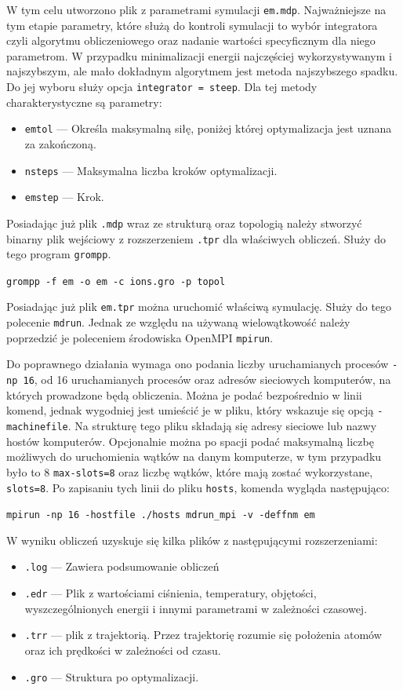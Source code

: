 W tym celu utworzono plik z parametrami symulacji \texttt{em.mdp}. Najważniejsze na tym etapie parametry, które służą do kontroli symulacji to wybór integratora czyli algorytmu obliczeniowego oraz nadanie wartości specyficznym dla niego parametrom. W przypadku minimalizacji energii najczęściej wykorzystywanym i najszybszym, ale mało dokładnym algorytmem jest metoda najszybszego spadku. Do jej wyboru służy opcja \texttt{integrator = steep}. Dla tej metody charakterystyczne są parametry:
\begin{itemize}
\item \texttt{emtol} --- Określa maksymalną siłę, poniżej której optymalizacja jest uznana za zakończoną.
\item \texttt{nsteps} --- Maksymalna liczba kroków optymalizacji.
\item \texttt{emstep} --- Krok.
\end{itemize}

Posiadając już plik \texttt{.mdp} wraz ze strukturą oraz topologią należy stworzyć binarny plik wejściowy z rozszerzeniem \texttt{.tpr} dla właściwych obliczeń. Służy do tego program \texttt{grompp}. 

\texttt{grompp -f em -o em -c ions.gro -p topol}

Posiadając już plik \texttt{em.tpr} można uruchomić właściwą symulację. Służy do tego polecenie \texttt{mdrun}. Jednak ze względu na używaną wielowątkowość należy poprzedzić je poleceniem środowiska OpenMPI \texttt{mpirun}.

Do poprawnego działania wymaga ono podania liczby uruchamianych procesów \texttt{-np 16}, od 16 uruchamianych procesów oraz adresów sieciowych komputerów, na których prowadzone będą obliczenia. Można je podać bezpośrednio w linii komend, jednak wygodniej jest umieścić je w pliku, który wskazuje się opcją \texttt{-machinefile}. Na strukturę tego pliku składają się adresy sieciowe lub nazwy hostów komputerów. Opcjonalnie można po spacji podać maksymalną liczbę możliwych do uruchomienia wątków na danym komputerze, w tym przypadku było to 8 \texttt{max-slots=8} oraz liczbę wątków, które mają zostać wykorzystane, \texttt{slots=8}. Po zapisaniu tych linii do pliku \texttt{hosts}, komenda wygląda następująco:

\texttt{mpirun -np 16 -hostfile ./hosts mdrun\_mpi -v -deffnm em}

W wyniku obliczeń uzyskuje się kilka plików z następującymi rozszerzeniami:
\begin{itemize}
\item \texttt{.log} --- Zawiera podsumowanie obliczeń
\item \texttt{.edr} --- Plik z wartościami ciśnienia, temperatury, objętości, wyszczególnionych energii i innymi parametrami w zależności czasowej.
\item \texttt{.trr} --- plik z trajektorią. Przez trajektorię rozumie się położenia atomów oraz ich prędkości w zależności od czasu.
\item \texttt{.gro} --- Struktura po optymalizacji.
\end{itemize}

